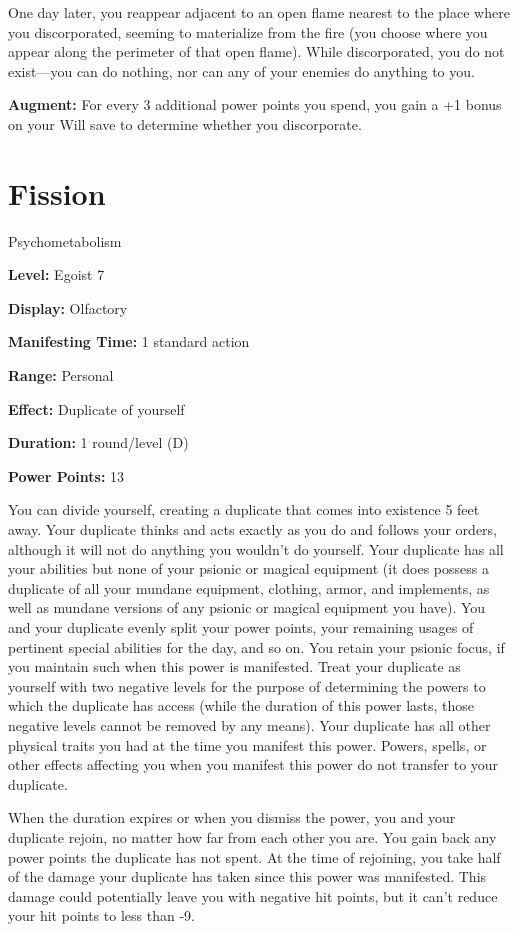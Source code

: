 \documentclass{article}
\begin{document}
One day later, you reappear adjacent to an open flame nearest to the place where 
you discorporated, seeming to materialize from the fire (you choose where you appear 
along the perimeter of that open flame). While discorporated, you do not exist---you 
can do nothing, nor can any of your enemies do anything to you.

\textbf{Augment:} For every 3 additional power points you spend, you gain a +1 
bonus on your Will save to determine whether you discorporate.

\vspace{12pt}
\section*{Fission}

Psychometabolism

\textbf{Level:} Egoist 7

\textbf{Display:} Olfactory

\textbf{Manifesting Time:} 1 standard action

\textbf{Range:} Personal

\textbf{Effect:} Duplicate of yourself

\textbf{Duration:} 1 round/level (D)

\textbf{Power Points:} 13

You can divide yourself, creating a duplicate that comes into existence 5 feet 
away. Your duplicate thinks and acts exactly as you do and follows your orders, 
although it will not do anything you wouldn't do yourself. Your duplicate has all 
your abilities but none of your psionic or magical equipment (it does possess a 
duplicate of all your mundane equipment, clothing, armor, and implements, as well 
as mundane versions of any psionic or magical equipment you have). You and your 
duplicate evenly split your power points, your remaining usages of pertinent special 
abilities for the day, and so on. You retain your psionic focus, if you maintain 
such when this power is manifested. Treat your duplicate as yourself with two negative 
levels for the purpose of determining the powers to which the duplicate has access 
(while the duration of this power lasts, those negative levels cannot be removed 
by any means). Your duplicate has all other physical traits you had at the time 
you manifest this power. Powers, spells, or other effects affecting you when you 
manifest this power do not transfer to your duplicate. 

When the duration expires or when you dismiss the power, you and your duplicate 
rejoin, no matter how far from each other you are. You gain back any power points 
the duplicate has not spent. At the time of rejoining, you take half of the damage 
your duplicate has taken since this power was manifested. This damage could potentially 
leave you with negative hit points, but it can't reduce your hit points to less 
than -9.
\end{document}
